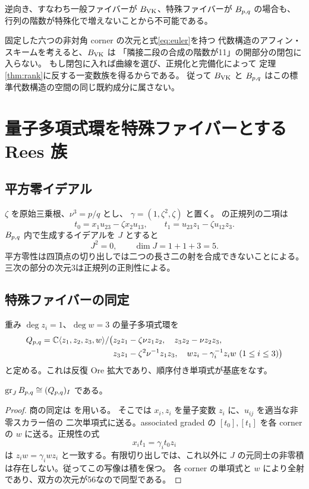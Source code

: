 逆向き、すなわち一般ファイバーが $B_{\mathrm{VK}}$、特殊ファイバーが $B_{p,q}$ の場合も、
行列の階数が特殊化で増えないことから不可能である。

固定した六つの非対角 corner の次元と式\eqref{eq:euler}を持つ
代数構造のアフィン・スキームを考えると、$B_{\mathrm{VK}}$ は
「隣接二段の合成の階数が11」の開部分の閉包に入らない。
もし閉包に入れば曲線を選び、正規化と完備化によって
定理\ref{thm:rank}に反する一変数族を得るからである。
従って $B_{\mathrm{VK}}$ と $B_{p,q}$ はこの標準代数構造の空間の同じ既約成分に属さない。

\section{量子多項式環を特殊ファイバーとする Rees 族}\label{sec:rees}
\subsection{平方零イデアル}
$\zeta$ を原始三乗根、$\nu^3=p/q$ とし、
$\gamma=(1,\zeta^2,\zeta)$ と置く。
\cite[Proposition 4.1, Lemma 4.6]{LO} の正規列の二項は
\[
 t_0=x_1u_{23}-\zeta x_2u_{13},\qquad
 t_1=u_{23}z_1-\zeta u_{12}z_3.
\]
$B_{p,q}$ 内で生成するイデアルを $J$ とすると
\[
 J^2=0,\qquad \dim J=1+1+3=5.
\]
平方零性は四頂点の切り出しでは二つの長さ二の射を合成できないことによる。
三次の部分の次元3は正規列の正則性による。

\subsection{特殊ファイバーの同定}
重み $\deg z_i=1$、$\deg w=3$ の量子多項式環を
\begin{equation}\label{eq:quantum}
\begin{split}
Q_{p,q}=\mathbb C\langle z_1,z_2,z_3,w\rangle/\bigl(&
 z_2z_1-\zeta\nu z_1z_2,\quad z_3z_2-\nu z_2z_3,\\
&z_3z_1-\zeta^2\nu^{-1}z_1z_3,\quad
 wz_i-\gamma_i^{-1}z_iw\ (1\le i\le3)\bigr)
\end{split}
\end{equation}
と定める。これは反復 Ore 拡大であり、順序付き単項式が基底をなす。

\begin{proposition}\label{prop:gr}
$\operatorname{gr}_JB_{p,q}\cong(Q_{p,q})_I$ である。
\end{proposition}
\begin{proof}
商の同定は \cite[Theorem 4.3, (33)]{LO} を用いる。
そこでは $x_i,z_i$ を量子変数 $z_i$ に、$u_{ij}$ を適当な非零スカラー倍の
二次単項式に送る。associated graded の $[t_0],[t_1]$ を各 corner の
$w$ に送る。正規性の式
\[
 x_i t_1=\gamma_i t_0z_i
\]
は $z_iw=\gamma_i wz_i$ と一致する。有限切り出しでは、これ以外に
$J$ の元同士の非零積は存在しない。従ってこの写像は積を保つ。
各 corner の単項式と $w$ により全射であり、双方の次元が56なので同型である。
\end{proof}

